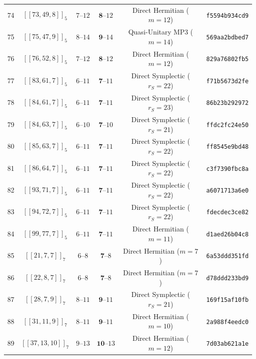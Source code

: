 \documentclass[11pt,a4paper]{article}
\theoremstyle{remark}
\begin{document}
{\begin{longtable}{@{}rccccl@{}}
74 & $[[73,49,8]]_{5}$ & $7\text{--}12$ & $\mathbf{8}\text{--}12$ & Direct Hermitian ($m=12$) & \texttt{f5594b934cd9} \\
75 & $[[75,47,9]]_{5}$ & $8\text{--}14$ & $\mathbf{9}\text{--}14$ & Quasi-Unitary MP3 ($m=14$) & \texttt{569aa2bdbed7} \\
76 & $[[76,52,8]]_{5}$ & $7\text{--}12$ & $\mathbf{8}\text{--}12$ & Direct Hermitian ($m=12$) & \texttt{829a76802fb5} \\
77 & $[[83,61,7]]_{5}$ & $6\text{--}11$ & $\mathbf{7}\text{--}11$ & Direct Symplectic ($r_S=22$) & \texttt{f71b5673d2fe} \\
78 & $[[84,61,7]]_{5}$ & $6\text{--}11$ & $\mathbf{7}\text{--}11$ & Direct Symplectic ($r_S=23$) & \texttt{86b23b292972} \\
79 & $[[84,63,7]]_{5}$ & $6\text{--}10$ & $\mathbf{7}\text{--}10$ & Direct Symplectic ($r_S=21$) & \texttt{ffdc2fc24e50} \\
80 & $[[85,63,7]]_{5}$ & $6\text{--}11$ & $\mathbf{7}\text{--}11$ & Direct Symplectic ($r_S=22$) & \texttt{ff8545e9bd48} \\
81 & $[[86,64,7]]_{5}$ & $6\text{--}11$ & $\mathbf{7}\text{--}11$ & Direct Symplectic ($r_S=22$) & \texttt{c3f7390fbc8a} \\
82 & $[[93,71,7]]_{5}$ & $6\text{--}11$ & $\mathbf{7}\text{--}11$ & Direct Symplectic ($r_S=22$) & \texttt{a6071713a6e0} \\
83 & $[[94,72,7]]_{5}$ & $6\text{--}11$ & $\mathbf{7}\text{--}11$ & Direct Symplectic ($r_S=22$) & \texttt{fdecdec3ce82} \\
84 & $[[99,77,7]]_{5}$ & $6\text{--}11$ & $\mathbf{7}\text{--}11$ & Direct Hermitian ($m=11$) & \texttt{d1aed26b04c8} \\
\midrule
85 & $[[21,7,7]]_{7}$ & $6\text{--}8$ & $\mathbf{7}\text{--}8$ & Direct Hermitian ($m=7$) & \texttt{6a53ddd351fd} \\
86 & $[[22,8,7]]_{7}$ & $6\text{--}8$ & $\mathbf{7}\text{--}8$ & Direct Hermitian ($m=7$) & \texttt{d78ddd233bd9} \\
87 & $[[28,7,9]]_{7}$ & $8\text{--}11$ & $\mathbf{9}\text{--}11$ & Direct Symplectic ($r_S=21$) & \texttt{169f15af10fb} \\
88 & $[[31,11,9]]_{7}$ & $8\text{--}11$ & $\mathbf{9}\text{--}11$ & Direct Hermitian ($m=10$) & \texttt{2a988f4eedc0} \\
89 & $[[37,13,10]]_{7}$ & $9\text{--}13$ & $\mathbf{10}\text{--}13$ & Direct Hermitian ($m=12$) & \texttt{7d03ab621a1e} \\

\end{longtable}}
\end{document}
